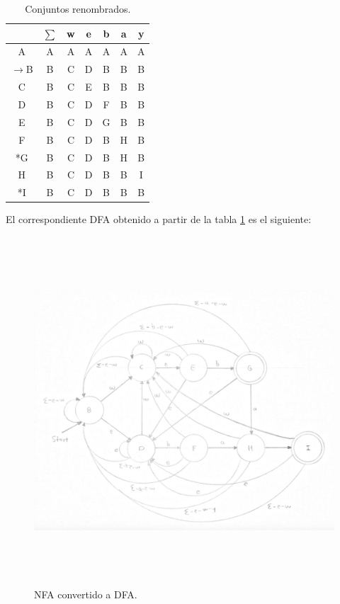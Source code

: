 \documentclass[12pt]{article}
\begin{document}
\vspace{2em}

\begin{table}[H]
\centering
\begin{tabular}{|c|c|c|c|c|c|c|}
\hline 
\rule[-1ex]{0pt}{2.5ex}  & $\sum$ & w & e & b & a & y \\ 
\hline 
\rule[-1ex]{0pt}{2.5ex} A & A & A & A & A & A & A \\ 
\hline 
\rule[-1ex]{0pt}{2.5ex} $\rightarrow$B & B & C & D & B & B & B \\ 
\hline 
\rule[-1ex]{0pt}{2.5ex} C & B & C & E & B & B & B \\ 
\hline 
\rule[-1ex]{0pt}{2.5ex} D & B & C & D & F & B & B \\ 
\hline 
\rule[-1ex]{0pt}{2.5ex} E & B & C & D & G & B & B \\ 
\hline 
\rule[-1ex]{0pt}{2.5ex} F & B & C & D & B & H & B \\ 
\hline 
\rule[-1ex]{0pt}{2.5ex} *G & B & C & D & B & H & B \\ 
\hline 
\rule[-1ex]{0pt}{2.5ex} H & B & C & D & B & B & I \\ 
\hline 
\rule[-1ex]{0pt}{2.5ex} *I & B & C & D & B & B & B \\ 
\hline 
\end{tabular}
\caption{Conjuntos renombrados.}
\label{tabla:conjuntos_renombrados}
\end{table}

\vspace{1em}

El correspondiente DFA obtenido a partir de la tabla \ref{tabla:conjuntos_renombrados} es el siguiente:

\begin{figure}[H]
\centering
\includegraphics[width=\textwidth, height=13cm]{automata}
\caption{NFA convertido a DFA.}
\label{figura:automata}
\end{figure}
\end{document}

